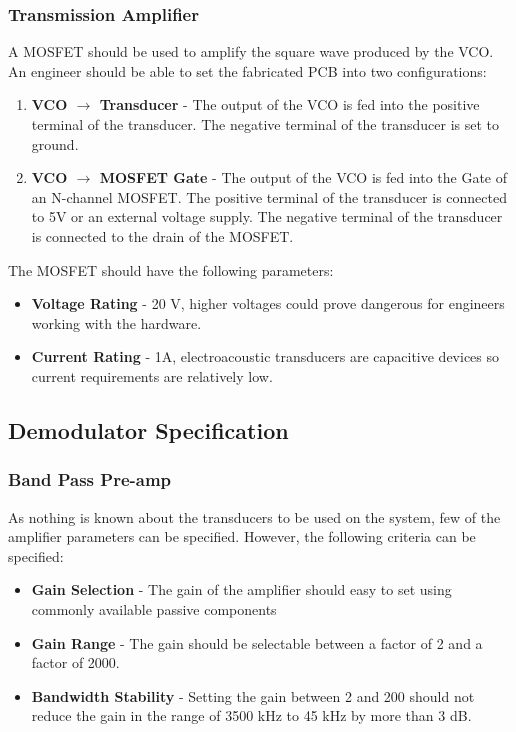 \subsubsection{Transmission Amplifier}
\label{sec:specificationTransmissionAmplifier}
A MOSFET should be used to amplify the square wave produced by the VCO.
An engineer should be able to set the fabricated PCB into two configurations:
\begin{enumerate}
    \item \textbf{VCO $\rightarrow$ Transducer} - The output of the VCO is fed into the positive terminal of the transducer.
    The negative terminal of the transducer is set to ground. 
    \item \textbf{VCO $\rightarrow$ MOSFET Gate} - The output of the VCO is fed into the Gate of an N-channel MOSFET. The positive terminal of the transducer is connected to 5V or an external voltage supply.
    The negative terminal of the transducer is connected to the drain of the MOSFET.
\end{enumerate}
The MOSFET should have the following parameters:
\begin{itemize}
    \item \textbf{Voltage Rating} - 20 V, higher voltages could prove dangerous for engineers working with the hardware.
    \item \textbf{Current Rating} - 1A, electroacoustic transducers are capacitive devices so current requirements are relatively low. 
\end{itemize}

\subsection{Demodulator Specification}

\subsubsection{Band Pass Pre-amp}
As nothing is known about the transducers to be used on the system, few of the amplifier parameters can be specified.
However, the following criteria can be specified:
\begin{itemize}
    \item \textbf{Gain Selection} - The gain of the amplifier should easy to set using commonly available passive components
    \item \textbf{Gain Range} - The gain should be selectable between a factor of 2 and a factor of 2000.
    \item \textbf{Bandwidth Stability} - Setting the gain between 2 and 200 should not reduce the gain in the range of 3500 kHz to 45 kHz by more than 3 dB.
\end{itemize} 
